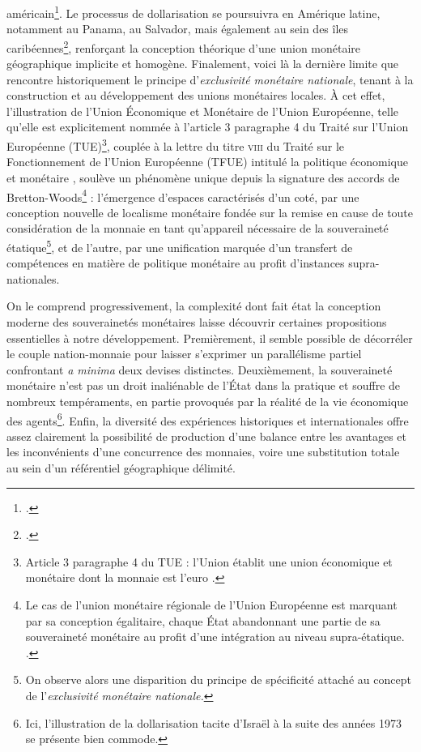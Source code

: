 {américain\footnote{.}. Le processus de dollarisation se poursuivra en Amérique latine, notamment au Panama, au Salvador, mais également au sein des îles caribéennes\footnote{.}, renforçant la conception théorique d'une union monétaire géographique implicite et homogène. Finalement, voici là la dernière limite que rencontre historiquement le principe d'\emph{exclusivité monétaire nationale}, tenant à la construction et au développement des unions monétaires locales. À cet effet, l'illustration de l'Union Économique et Monétaire de l'Union Européenne, telle qu'elle est explicitement nommée à l'article 3 paragraphe 4 du Traité sur l'Union Européenne (\acrshort{TUE})\footnote{Article 3 paragraphe 4 du TUE : \og  l'Union établit une union économique et monétaire dont la monnaie est l'euro \fg{}.}, couplée à la lettre du titre \textsc{viii} du Traité sur le Fonctionnement de l'Union Européenne (\acrshort{TFUE}) intitulé \og la politique économique et monétaire \fg{}, soulève un phénomène unique depuis la signature des accords de Bretton-Woods\footnote{Le cas de l'union monétaire régionale de l'Union Européenne est marquant par sa conception égalitaire, chaque État abandonnant une partie de sa souveraineté monétaire au profit d'une intégration au niveau supra-étatique. .} : l'émergence d'espaces caractérisés d'un coté, par une conception nouvelle de localisme monétaire fondée sur la remise en cause de toute considération de la monnaie en tant qu'appareil nécessaire de la souveraineté étatique\footnote{On observe alors une disparition du principe de spécificité attaché au concept de l'\emph{exclusivité monétaire nationale.}}, et de l'autre, par une unification marquée d'un transfert de compétences en matière de politique monétaire au profit d'instances supra-nationales.\par
On le comprend progressivement, la complexité dont fait état la conception moderne des souverainetés monétaires laisse découvrir certaines propositions essentielles à notre développement. Premièrement, il semble possible de décorréler le couple nation-monnaie pour laisser s'exprimer un parallélisme partiel confrontant \emph{a minima} deux devises distinctes. Deuxièmement, la souveraineté monétaire n'est pas un droit inaliénable de l'État dans la pratique et souffre de nombreux tempéraments, en partie provoqués par la réalité de la vie économique des agents\footnote{Ici, l'illustration de la dollarisation tacite d'Israël à la suite des années 1973 se présente bien commode.}. Enfin, la diversité des expériences historiques et internationales offre assez clairement la possibilité de production d'une balance entre les avantages et les inconvénients d'une concurrence des monnaies, voire une substitution totale au sein d'un référentiel géographique délimité. 

}
